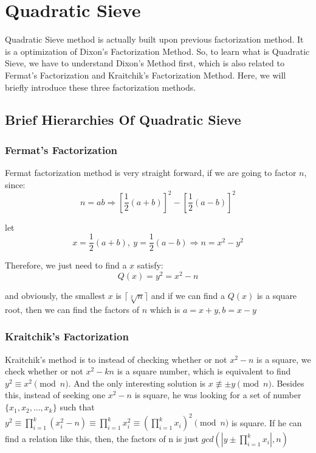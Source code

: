 \documentclass[12pt]{article} %
\begin{document}
	\section{Quadratic Sieve}
	
	Quadratic Sieve method is actually built upon previous factorization method. It is a optimization of Dixon's Factorization Method. So, to learn what is Quadratic Sieve, we have to understand Dixon's Method first, which is also related to Fermat's Factorization and Kraitchik's Factorization Method. Here, we will briefly introduce these three factorization methods.
	
	\subsection {Brief Hierarchies Of Quadratic Sieve}
	
	\subsubsection {Fermat's Factorization}
	Fermat factorization method is very straight forward, if we are going to factor $n$, since: $$n = ab \Rightarrow \left [\frac{1}{2}(a+b) \right ]^{2} - \left [\frac{1}{2}(a-b) \right ]^{2}$$
	
	let $$ x= \frac{1}{2}(a+b),\ y= \frac{1}{2}(a-b) \Rightarrow n = x^2 - y^2$$ 
	
	Therefore, we just need to find a $x$ satisfy: $$Q(x) = y^2 = x^2 - n$$ 
	
	and obviously, the smallest $x$ is $\lceil \sqrt[2]{n}\rceil$ and if we can find a $Q(x)$ is a square root, then we can find the factors of $n$ which is $a=x+y, b=x-y$
	
	\subsubsection {Kraitchik's Factorization}
	Kraitchik's method is to instead of checking whether or not $x^2-n$ is a square, we check whether or not $x^2 - kn$ is a square number, which is equivalent to find $y^2 \equiv x^2 \pmod{n} $. And the only interesting solution is $ x \not\equiv \pm y \pmod{n}$. Besides this, instead of seeking one $x^2-n$ is square, he was looking for a set of number $ \{x_1, x_2, \dots, x_k\} $ such that $\displaystyle y^2 \equiv \prod_{i=1}^k{(x_i^2 - n)} \equiv \prod_{i=1}^k{x_i^2} \equiv \left (\prod_{i=1}^k{x_i}\right)^2 \pmod{n} $ is square. If he can find a relation like this, then, the factors of n is just $\displaystyle gcd(|y \pm \prod_{i=1}^k{x_i}|, n)$
	
\end{document}
